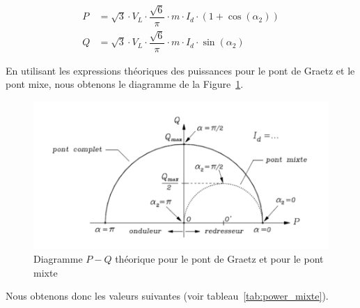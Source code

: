 \documentclass[a4paper, 11pt, openany, oneside, french]{article}
\begin{document}
\begin{align*}
    P &= \sqrt{3} \cdot V_L \cdot \dfrac{\sqrt{6}}{\pi} \cdot m \cdot I_d \cdot \left(1 + \cos{\left(\alpha_2\right)}\right)\\
    Q &= \sqrt{3} \cdot V_L \cdot \dfrac{\sqrt{6}}{\pi} \cdot m \cdot I_d \cdot \sin{\left(\alpha_2\right)}
\end{align*}

En utilisant les expressions théoriques des puissances pour le pont de Graetz et le pont mixe, nous obtenons le diagramme de la Figure~\ref{fig:comp_circle}.

\begin{figure}[!ht]
    \centering
    \includegraphics[width=0.8\linewidth]{circle}
    \caption{Diagramme $P-Q$ théorique pour le pont de Graetz et pour le pont mixte}
    \label{fig:comp_circle}
\end{figure}

Nous obtenons donc les valeurs suivantes (voir tableau~\ref{tab:power_mixte}).
\end{document}
